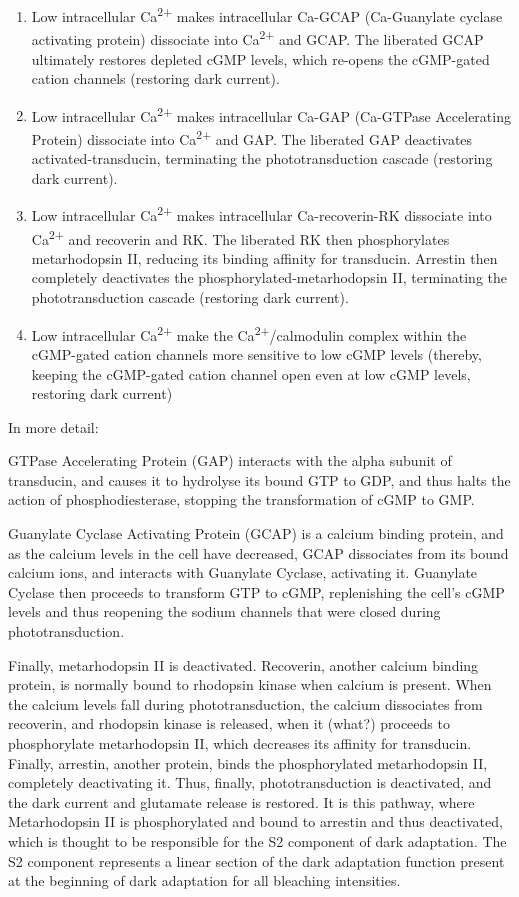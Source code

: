 \documentclass[]{book}
\providecommand{\tightlist}{%
  \setlength{\itemsep}{0pt}\setlength{\parskip}{0pt}}
\begin{document}
\begin{enumerate}
\def\labelenumi{\arabic{enumi}.}
\tightlist
\item
  Low intracellular Ca\textsuperscript{2+} makes intracellular Ca-GCAP (Ca-Guanylate cyclase activating protein) dissociate into Ca\textsuperscript{2+} and GCAP. The liberated GCAP ultimately restores depleted cGMP levels, which re-opens the cGMP-gated cation channels (restoring dark current).
\item
  Low intracellular Ca\textsuperscript{2+} makes intracellular Ca-GAP (Ca-GTPase Accelerating Protein) dissociate into Ca\textsuperscript{2+} and GAP. The liberated GAP deactivates activated-transducin, terminating the phototransduction cascade (restoring dark current).
\item
  Low intracellular Ca\textsuperscript{2+} makes intracellular Ca-recoverin-RK dissociate into Ca\textsuperscript{2+} and recoverin and RK. The liberated RK then phosphorylates metarhodopsin II, reducing its binding affinity for transducin. Arrestin then completely deactivates the phosphorylated-metarhodopsin II, terminating the phototransduction cascade (restoring dark current).
\item
  Low intracellular Ca\textsuperscript{2+} make the Ca\textsuperscript{2+}/calmodulin complex within the cGMP-gated cation channels more sensitive to low cGMP levels (thereby, keeping the cGMP-gated cation channel open even at low cGMP levels, restoring dark current)
\end{enumerate}

In more detail:

GTPase Accelerating Protein (GAP) interacts with the alpha subunit of transducin, and causes it to hydrolyse its bound GTP to GDP, and thus halts the action of phosphodiesterase, stopping the transformation of cGMP to GMP.

Guanylate Cyclase Activating Protein (GCAP) is a calcium binding protein, and as the calcium levels in the cell have decreased, GCAP dissociates from its bound calcium ions, and interacts with Guanylate Cyclase, activating it. Guanylate Cyclase then proceeds to transform GTP to cGMP, replenishing the cell's cGMP levels and thus reopening the sodium channels that were closed during phototransduction.

Finally, metarhodopsin II is deactivated. Recoverin, another calcium binding protein, is normally bound to rhodopsin kinase when calcium is present. When the calcium levels fall during phototransduction, the calcium dissociates from recoverin, and rhodopsin kinase is released, when it (what?) proceeds to phosphorylate metarhodopsin II, which decreases its affinity for transducin. Finally, arrestin, another protein, binds the phosphorylated metarhodopsin II, completely deactivating it. Thus, finally, phototransduction is deactivated, and the dark current and glutamate release is restored. It is this pathway, where Metarhodopsin II is phosphorylated and bound to arrestin and thus deactivated, which is thought to be responsible for the S2 component of dark adaptation. The S2 component represents a linear section of the dark adaptation function present at the beginning of dark adaptation for all bleaching intensities.
\end{document}
